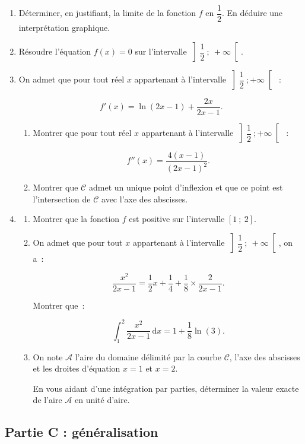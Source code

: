 \begin{enumerate}
\item Déterminer, en justifiant, la limite de la fonction $f$ en $\dfrac{1}{2}$. En déduire une interprétation graphique.
\item Résoudre l'équation $f(x) = 0$ sur l'intervalle $\left]\dfrac{1}{2}~;~+\infty\right[$.
\item On admet que pour tout réel $x$ appartenant à l'intervalle $\left]\dfrac{1}{2}~;+\infty\right[$~:

\[f'(x) = \ln(2x-1) + \dfrac{2x}{2x-1}.\]

	\begin{enumerate}[label=\textbf{\alph*.}]
		\item Montrer que pour tout réel $x$ appartenant à l'intervalle $\left]\dfrac{1}{2}~;+\infty\right[$~:

\[f''(x) = \dfrac{4(x-1)}{(2x-1)^2}.\]

		\item Montrer que $\mathcal{C}$ admet un unique point d'inflexion et que ce point est l'intersection de $\mathcal{C}$ avec l'axe des abscisses.
	\end{enumerate}
\item
	\begin{enumerate}[label=\textbf{\alph*.}]
		\item Montrer que la fonction $f$ est positive sur l'intervalle $[1~;~2]$.
		\item On admet que pour tout $x$ appartenant à l'intervalle $\left]\dfrac{1}{2}~;~+\infty\right[$, on a~:
		
\[\dfrac{x^2}{2x-1} = \dfrac{1}{2}x + \dfrac{1}{4} + \dfrac{1}{8}\times\dfrac{2}{2x-1}.\]

Montrer que~:

\[\displaystyle\int_{1}^{2} \dfrac{x^2}{2x-1}\, \text{d}x = 1 + \dfrac{1}{8}\ln (3).\]

\item On note $\mathcal{A}$ l'aire du domaine délimité par la courbe $\mathcal{C}$, l'axe des abscisses et les droites d'équation $x=1$ et $x=2$.

En vous aidant d'une intégration par parties, déterminer la valeur exacte de l'aire $\mathcal{A}$ en unité d'aire.
	\end{enumerate}
\end{enumerate}


\subsection*{Partie C : généralisation}

